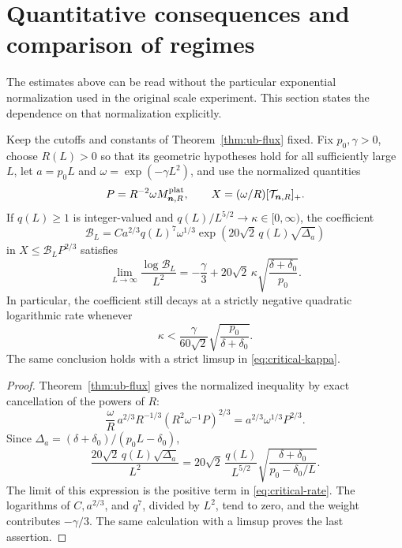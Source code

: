 \section{Quantitative consequences and comparison of regimes}
\label{sec:consequences}

The estimates above can be read without the particular exponential
normalization used in the original scale experiment. This section states
the dependence on that normalization explicitly.

\begin{corollary}
\label{cor:critical-coefficient}
Keep the cutoffs and constants of Theorem~\ref{thm:ub-flux} fixed.
Fix \(p_0,\gamma>0\), choose \(R(L)>0\) so that its geometric
hypotheses hold for all sufficiently large \(L\), let \(a=p_0L\) and
\(\omega=\exp(-\gamma L^2)\), and use the normalized quantities
\[
 P=R^{-2}\omega M^{\rm plat}_{\boldsymbol n,R},
 \qquad X=(\omega/R)[\mathcal T_{\boldsymbol n,R}]_+.
\]
If \(q(L)\ge1\) is integer-valued and
\(q(L)/L^{5/2}\to\kappa\in[0,\infty)\), the coefficient
\[
 \mathcal B_L
 =C a^{2/3}q(L)^7\omega^{1/3}
          \exp(20\sqrt2\,q(L)\sqrt{\Delta_a})
\]
in \(X\le\mathcal B_LP^{2/3}\) satisfies
\begin{equation}\label{eq:critical-rate}
 \lim_{L\to\infty}\frac{\log\mathcal B_L}{L^2}
 =-\frac{\gamma}{3}
       +20\sqrt2\,\kappa\sqrt{\frac{\delta+\delta_0}{p_0}}.
\end{equation}
In particular, the coefficient still decays at a strictly negative
quadratic logarithmic rate whenever
\begin{equation}\label{eq:critical-kappa}
 \kappa<
 \frac{\gamma}{60\sqrt2}
           \sqrt{\frac{p_0}{\delta+\delta_0}}.
\end{equation}
The same conclusion holds with a strict limsup in
\eqref{eq:critical-kappa}.
\end{corollary}

\begin{proof}
Theorem~\ref{thm:ub-flux} gives the normalized inequality by exact
cancellation of the powers of \(R\):
\[
 \frac{\omega}{R}\,
     a^{2/3}R^{-1/3}(R^2\omega^{-1}P)^{2/3}
 =a^{2/3}\omega^{1/3}P^{2/3}.
\]
Since \(\Delta_a=(\delta+\delta_0)/(p_0L-\delta_0)\),
\[
 \frac{20\sqrt2\,q(L)\sqrt{\Delta_a}}{L^2}
 =20\sqrt2\,\frac{q(L)}{L^{5/2}}
       \sqrt{\frac{\delta+\delta_0}{p_0-\delta_0/L}}.
\]
The limit of this expression is the positive term in
\eqref{eq:critical-rate}. The logarithms of \(C,a^{2/3}\), and \(q^7\),
divided by \(L^2\), tend to zero, and the weight contributes
\(-\gamma/3\). The same calculation with a limsup proves the last
assertion.
\end{proof}

